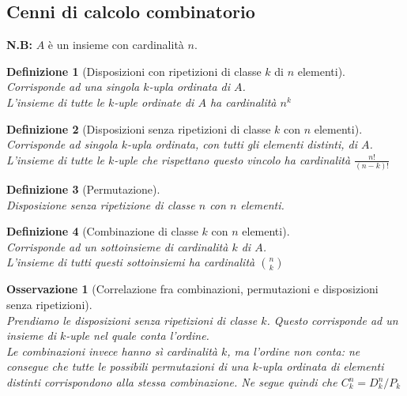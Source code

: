 \documentclass{article}
\newtheorem{definition}{Definizione}[section]
\newtheorem{osservation}{Osservazione}[section]
\begin{document}
    \subsection{Cenni di calcolo combinatorio}
        \textbf{N.B:} $A$ è un insieme con cardinalità $n$.
        \begin{definition}[Disposizioni con ripetizioni di classe $k$ di $n$ elementi] \, \\
            Corrisponde ad una singola $k$-upla ordinata di $A$. \\
            L'insieme di tutte le $k$-uple ordinate di $A$ ha cardinalità $n^k$
        \end{definition}
        \begin{definition}[Disposizioni senza ripetizioni di classe $k$ con $n$ elementi] \, \\
            Corrisponde ad singola $k$-upla ordinata, con tutti gli elementi distinti, di $A$. \\
            L'insieme di tutte le $k$-uple che rispettano questo vincolo ha cardinalità $\frac{n!}{\left(n-k\right)!}$
        \end{definition}
        \begin{definition}[Permutazione] \, \\
            Disposizione senza ripetizione di classe $n$ con $n$ elementi. 
        \end{definition}
        \begin{definition}[Combinazione di classe $k$ con $n$ elementi] \, \\
            Corrisponde ad un sottoinsieme di cardinalità $k$ di $A$. \\
            L'insieme di tutti questi sottoinsiemi ha cardinalità $\binom{n}{k}$
        \end{definition}
        \begin{osservation}[Correlazione fra combinazioni, permutazioni e disposizioni senza ripetizioni] \, \\
            Prendiamo le disposizioni senza ripetizioni di classe $k$. Questo corrisponde ad un insieme di 
            $k$-uple nel quale conta l'ordine. \\
            Le combinazioni invece hanno sì cardinalità $k$, ma l'ordine non conta: ne consegue 
            che tutte le possibili permutazioni di una $k$-upla ordinata di elementi distinti 
            corrispondono alla stessa combinazione. Ne segue quindi che $C^n_k = {D^n_k}/{P_k}$
        \end{osservation}
\end{document}
